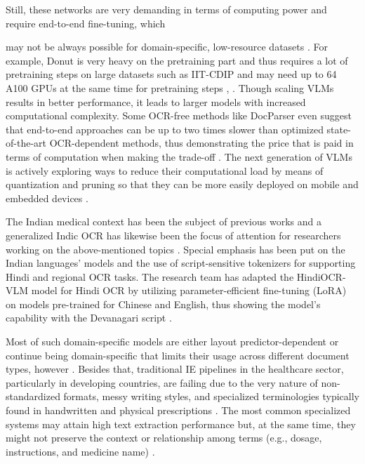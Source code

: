\documentclass[conference,twocolumn]{IEEEtran}
\begin{document}
Still, these networks are very demanding in terms of computing power and
require end-to-end fine-tuning, which

may not be always possible for domain-specific, low-resource datasets
\cite{ref3}. For example, Donut is very heavy on the pretraining part and
thus requires a lot of pretraining steps on large datasets such as
IIT-CDIP and may need up to 64 A100 GPUs at the same time for
pretraining steps \cite{ref4}, \cite{ref18}. Though scaling VLMs results in
better performance, it leads to larger models with increased
computational complexity. Some OCR-free methods like DocParser even
suggest that end-to-end approaches can be up to two times slower than
optimized state-of-the-art OCR-dependent methods, thus demonstrating the
price that is paid in terms of computation when making the trade-off
\cite{ref3}. The next generation of VLMs is actively exploring ways to
reduce their computational load by means of quantization and pruning so
that they can be more easily deployed on mobile and embedded devices
\cite{ref5}.

The Indian medical context has been the subject of previous works and a
generalized Indic OCR has likewise been the focus of attention for
researchers working on the above-mentioned topics \cite{ref5}. Special
emphasis has been put on the Indian languages' models
and the use of script-sensitive tokenizers for supporting Hindi and
regional OCR tasks. The research team has adapted the HindiOCR-VLM model
for Hindi OCR by utilizing parameter-efficient fine-tuning (LoRA) on
models pre-trained for Chinese and English, thus showing the
model's capability with the Devanagari script \cite{ref5}.

Most of such domain-specific models are either layout
predictor-dependent or continue being domain-specific that limits their
usage across different document types, however \cite{ref5}. Besides that,
traditional IE pipelines in the healthcare sector, particularly in
developing countries, are failing due to the very nature of
non-standardized formats, messy writing styles, and specialized
terminologies typically found in handwritten and physical prescriptions
\cite{ref6}. The most common specialized systems may attain high text
extraction performance but, at the same time, they might not preserve
the context or relationship among terms (e.g., dosage, instructions, and
medicine name) \cite{ref6}.
\end{document}
